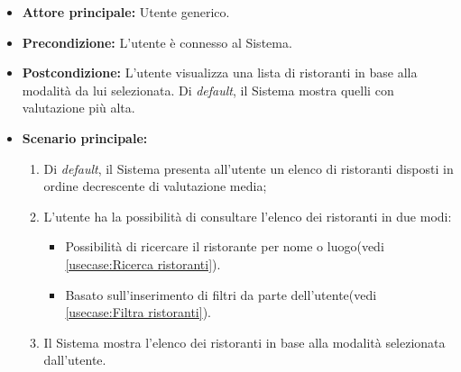 \label{usecase:Consultazione elenco ristoranti}
\begin{itemize}
	\item \textbf{Attore principale:} Utente generico.

	\item \textbf{Precondizione:}
	      L'utente è connesso al Sistema.

	\item \textbf{Postcondizione:} L'utente visualizza una lista di ristoranti in base alla modalità da lui selezionata.
    Di \textit{default}, il Sistema mostra quelli con valutazione più alta.

	\item \textbf{Scenario principale:}
	      \begin{enumerate}
              \item Di \textit{default}, il Sistema presenta all'utente un elenco di ristoranti disposti in ordine decrescente di valutazione media;
              
		      \item L'utente ha la possibilità di consultare l'elenco dei ristoranti in due modi:
		      \begin{itemize}
                \item Possibilità di ricercare il ristorante per nome o luogo(vedi \autoref{usecase:Ricerca ristoranti}).
                \item Basato sull'inserimento di filtri da parte dell'utente(vedi \autoref{usecase:Filtra ristoranti}).
              \end{itemize}

		      \item Il Sistema mostra l'elenco dei ristoranti in base alla modalità selezionata dall'utente.
		    
	      \end{enumerate}
\end{itemize}

